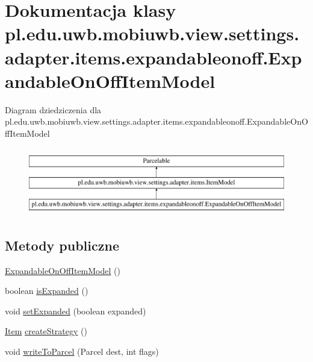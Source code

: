 \hypertarget{classpl_1_1edu_1_1uwb_1_1mobiuwb_1_1view_1_1settings_1_1adapter_1_1items_1_1expandableonoff_1_1_expandable_on_off_item_model}{}\section{Dokumentacja klasy pl.\+edu.\+uwb.\+mobiuwb.\+view.\+settings.\+adapter.\+items.\+expandableonoff.\+Expandable\+On\+Off\+Item\+Model}
\label{classpl_1_1edu_1_1uwb_1_1mobiuwb_1_1view_1_1settings_1_1adapter_1_1items_1_1expandableonoff_1_1_expandable_on_off_item_model}
Diagram dziedziczenia dla pl.\+edu.\+uwb.\+mobiuwb.\+view.\+settings.\+adapter.\+items.\+expandableonoff.\+Expandable\+On\+Off\+Item\+Model\begin{figure}[H]
\begin{center}
\leavevmode
\includegraphics[height=3.000000cm]{classpl_1_1edu_1_1uwb_1_1mobiuwb_1_1view_1_1settings_1_1adapter_1_1items_1_1expandableonoff_1_1_expandable_on_off_item_model}
\end{center}
\end{figure}
\subsection*{Metody publiczne}
\begin{DoxyCompactItemize}
\item 
\hyperlink{classpl_1_1edu_1_1uwb_1_1mobiuwb_1_1view_1_1settings_1_1adapter_1_1items_1_1expandableonoff_1_1_expandable_on_off_item_model_af93083e1940f1383a8a249ee2462df13}{Expandable\+On\+Off\+Item\+Model} ()
\item 
boolean \hyperlink{classpl_1_1edu_1_1uwb_1_1mobiuwb_1_1view_1_1settings_1_1adapter_1_1items_1_1expandableonoff_1_1_expandable_on_off_item_model_aadaba56350b59f6d1b4d46e71bdcdf17}{is\+Expanded} ()
\item 
void \hyperlink{classpl_1_1edu_1_1uwb_1_1mobiuwb_1_1view_1_1settings_1_1adapter_1_1items_1_1expandableonoff_1_1_expandable_on_off_item_model_a83c813eaa46faed92acfb0906160515e}{set\+Expanded} (boolean expanded)
\item 
\hyperlink{classpl_1_1edu_1_1uwb_1_1mobiuwb_1_1view_1_1settings_1_1adapter_1_1items_1_1_item}{Item} \hyperlink{classpl_1_1edu_1_1uwb_1_1mobiuwb_1_1view_1_1settings_1_1adapter_1_1items_1_1expandableonoff_1_1_expandable_on_off_item_model_aa809749a85e96a5cd4c809f7fbbec36b}{create\+Strategy} ()
\item 
void \hyperlink{classpl_1_1edu_1_1uwb_1_1mobiuwb_1_1view_1_1settings_1_1adapter_1_1items_1_1expandableonoff_1_1_expandable_on_off_item_model_a9d67556a19a97a0cbd3e068e0fb8e6b5}{write\+To\+Parcel} (Parcel dest, int flags)
\end{DoxyCompactItemize}
